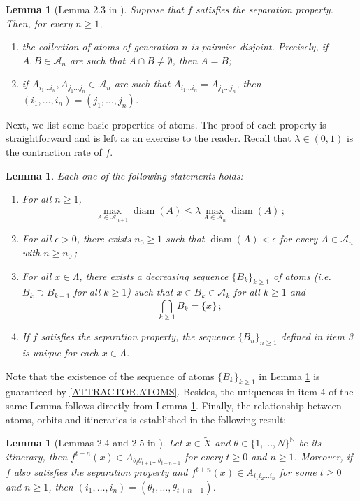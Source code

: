 \documentclass[a4paper]{article}
\newtheorem{lemma}[theorem]{Lemma}
\DeclareMathOperator{\diam}{diam}
\begin{document}
\begin{lemma}[Lemma 2.3 in \cite{CGM18}]\label{ATOMS.LEMMA1}
    Suppose that $f$ satisfies the separation property. Then, for every $n\geq1$,
    \begin{enumerate}
        \item\label{ATOMS.DISJOINT} the collection of atoms of generation $n$ is pairwise disjoint. Precisely, if $A,B\in\mathcal A_n$ are such that $A\cap B\neq\emptyset$, then $A=B$;
        \item if $A_{i_1\ldots i_n},A_{j_1\ldots j_n}\in\mathcal A_n$ are such that $A_{i_1\ldots i_n}=A_{j_1\ldots j_n}$, then $(i_1,\ldots,i_n)=(j_1,\ldots,j_n)$.
    \end{enumerate}
\end{lemma}

\noindent Next, we list some basic properties of atoms. The proof of each property is straightforward and is left as an exercise to the reader. Recall that $\lambda\in(0,1)$ is the contraction rate of $f$.

\begin{lemma}\label{ATOMS.LEMMA}
    Each one of the following statements holds:
    \begin{enumerate}
        \item For all $n\geq1$,
        \[
            \max_{A\in\mathcal A_{n+1}}\diam(A)\leq \lambda \max_{A\in\mathcal A_{n}}\diam(A)\,;
        \]
        \item For all $\epsilon>0$, there exists $n_0\geq1$ such that $\diam(A)<\epsilon$ for every $A\in\mathcal A_{n}$ with $n\geq n_0\,$;
        \item For all $x\in\Lambda$, there exists a decreasing sequence $\{B_k\}_{k\geq1}$ of atoms (i.e. $B_k\supset B_{k+1}$ for all $k\geq 1$) such that $x\in B_k\in\mathcal A_k$ for all $k\geq1$ and
        \begin{equation}
            \bigcap_{k\geq1}B_k=\{x\}\,;\label{ONEPOINT}
        \end{equation}
        \item If $f$ satisfies the separation property, the sequence  $\{B_n\}_{n\geq1}$ defined in item 3 is unique for each $x\in\Lambda$.
    \end{enumerate}
\end{lemma}
\noindent Note that the existence of the sequence of atoms $\{B_k\}_{k \geq 1}$ in Lemma \ref{ATOMS.LEMMA} is guaranteed by \eqref{ATTRACTOR.ATOMS}. Besides, the uniqueness in item 4 of the same Lemma follows directly from Lemma \ref{ATOMS.LEMMA1}. Finally, the relationship between atoms, orbits and itineraries is established in the following result:
\begin{lemma}[Lemmas 2.4 and 2.5 in \cite{CGM18}]\label{ATOMS.LEMMA2}
    Let $x\in\widetilde X$ and $\theta\in\{1,\ldots,N\}^{\mathbb N}$ be its itinerary, then $f^{t+n}(x)\in A_{\theta_t\theta_{t+1}\ldots\theta_{t+n-1}}$ for every $t\geq0$ and $n\geq1$. Moreover, if $f$ also satisfies the separation property and $f^{t+n}(x)\in A_{i_1i_2\ldots i_n}$ for some $t\geq0$ and $n\geq1$, then $(i_1,\ldots,i_n)=(\theta_t,\ldots,\theta_{t+n-1})$.
    \end{lemma}
\end{document}
